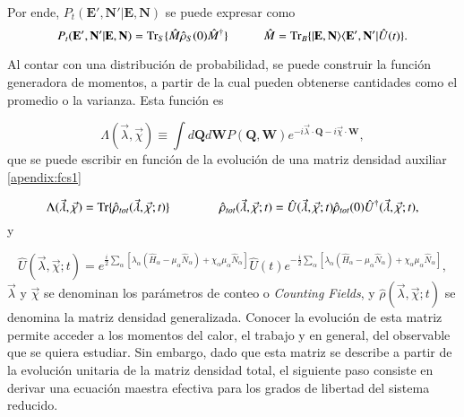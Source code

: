 Por ende, $P_{t}(\textbf{E}',\textbf{N}'|\textbf{E},\textbf{N})$ se puede expresar como
\begin{equation*}
    P_{t}(\textbf{E}',\textbf{N}'|\textbf{E},\textbf{N}) = \text{Tr}_{S}\{\hat{M} \hat{\rho}_{S}(0)\hat{M}^{\dagger} \}  \hspace{10mm} \hat{M} = \text{Tr}_{B}\{|\textbf{E},\textbf{N} \rangle \langle \textbf{E}',\textbf{N}' | \hat{U}(t)\}.
\end{equation*}

Al contar con una distribución de probabilidad, se puede construir la función generadora de momentos, a partir de la cual pueden obtenerse cantidades como el promedio o la varianza. Esta función es

\begin{equation}
    \Lambda(\vec{\lambda},\vec{\chi}) \equiv \int d\textbf{Q} d\textbf{W}P(\textbf{Q},\textbf{W}) e^{-i\vec{\lambda}\cdot \textbf{Q} -i\vec{\chi}\cdot \textbf{W} },
\label{sec2funciongeneradora}
\end{equation}
que se puede escribir en función de la evolución de una matriz densidad auxiliar \ref{apendix:fcs1}

\begin{equation}
    \Lambda(\vec{\lambda},\vec{\chi}) = \text{Tr}\{\hat{\rho}_{tot}(\vec{\lambda},\vec{\chi};t) \}    \hspace{14mm} \hat{\rho}_{tot}(\vec{\lambda},\vec{\chi};t) = \hat{U}(\vec{\lambda},\vec{\chi};t) \hat{\rho}_{tot}(0) \hat{U}^{\dagger}(\vec{\lambda},\vec{\chi};t),
    \label{sec2:evolucionconteo}
\end{equation}
y 

\begin{equation*}
    \hat{U}(\vec{\lambda},\vec{\chi};t) = e^{\frac{i}{2}\sum_{\alpha}[\lambda_{\alpha}(\hat{H}_{\alpha} - \mu_{\alpha}\hat{N}_{\alpha} ) + \chi_{\alpha}\mu_{\alpha}\hat{N}_{\alpha} ]  } \hat{U}(t) e^{-\frac{i}{2}\sum_{\alpha}[ \lambda_{\alpha}(\hat{H}_{\alpha} - \mu_{\alpha}\hat{N}_{\alpha}) + \chi_{\alpha}\mu_{\alpha}\hat{N}_{\alpha} ]},
\end{equation*}
$\vec{\lambda}$ y $\vec{\chi}$ se denominan los parámetros de conteo o \textit{Counting Fields}, y $\hat{\rho}(\vec{\lambda},\vec{\chi};t)$ se denomina la matriz densidad generalizada. Conocer la evolución de esta matriz permite acceder a los momentos del calor, el trabajo y en general, del observable que se quiera estudiar. Sin embargo, dado que esta matriz se describe a partir de la evolución unitaria de la matriz densidad total, el siguiente paso consiste en derivar una ecuación maestra efectiva para los grados de libertad del sistema reducido.

